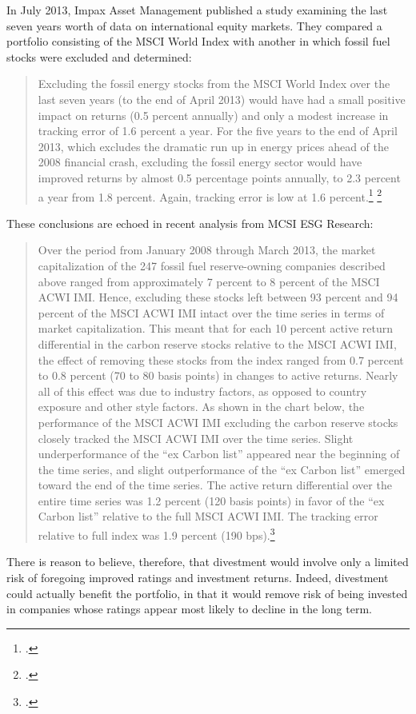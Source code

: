 \documentclass[10pt]{article}
\begin{document}
In July 2013, Impax Asset Management published a study examining the last seven years worth of data on international equity markets.
They compared a portfolio consisting of the MSCI World Index with another in which fossil fuel stocks were excluded and determined:
\begin{quote}
Excluding the fossil energy stocks from the MSCI World Index over the last seven years (to the end of April 2013) would have had a small positive impact on returns (0.5 percent annually) and only a modest increase in tracking error of 1.6 percent a year. For the five years to the end of April 2013, which excludes the dramatic run up in energy prices ahead of the 2008 financial crash, excluding the fossil energy sector would have improved returns by almost 0.5 percentage points annually, to 2.3 percent a year from 1.8 percent. Again, tracking error is low at 1.6 percent.\footcite[][p. 5]{ImpaxBeyondFF} \footcite[See also: ][]{ImpaxEnergyCollective}
\end{quote}
These conclusions are echoed in recent analysis from MCSI ESG Research:
\begin{quote}
Over the period from January 2008 through March 2013, the market capitalization of the 247 fossil fuel reserve-owning companies described above ranged from approximately 7 percent to 8 percent of the MSCI ACWI IMI. Hence, excluding these stocks left between 93 percent and 94 percent of the MSCI ACWI IMI intact over the time series in terms of market capitalization. This meant that for each 10 percent active return differential in the carbon reserve stocks relative to the MSCI ACWI IMI, the effect of removing these stocks from the index ranged from 0.7 percent to 0.8 percent (70 to 80 basis points) in changes to active returns. Nearly all of this effect was due to industry factors, as opposed to country exposure and other style factors. As shown in the chart below, the performance of the MSCI ACWI IMI excluding the carbon reserve stocks closely tracked the MSCI ACWI IMI over the time series. Slight underperformance of the ``ex Carbon list'' appeared near the beginning of the time series, and slight outperformance of the ``ex Carbon list'' emerged toward the end of the time series. The active return differential over the entire time series was 1.2 percent (120 basis points) in favor of the ``ex Carbon list'' relative to the full MSCI ACWI IMI. The tracking error relative to full index was 1.9 percent (190 bps).\footcite[][p. 5]{MCSIFFP}
\end{quote}
There is reason to believe, therefore, that divestment would involve only a limited risk of foregoing improved ratings and investment returns.
Indeed, divestment could actually benefit the portfolio, in that it would remove risk of being invested in companies whose ratings appear most likely to decline in the long term.
\end{document}
